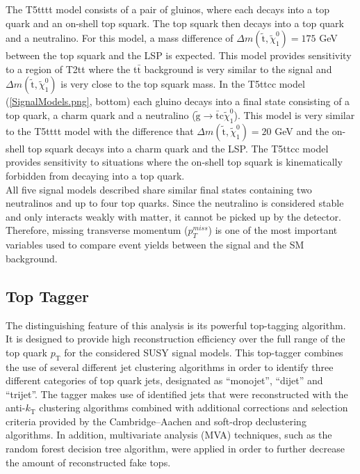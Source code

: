 The T5tttt model consists of a pair of gluinos, where each decays into a top quark and an on-shell top squark. The top squark then decays into a top quark and a neutralino. For this model, a mass difference of $\Delta m(\tilde{\text{t}},\tilde{\chi}_{1}^{0}) = 175$ GeV between the top squark and the LSP is expected. This model provides sensitivity to a region of T2tt where the t$\bar{\text{t}}$ background is very similar to the signal and $\Delta m(\tilde{\text{t}},\tilde{\chi}_{1}^{0})$ is very close to the top squark mass. In the T5ttcc model (\autoref{SignalModels.png}, bottom) each gluino decays into a final state consisting of a top quark, a charm quark and a neutralino ($\tilde{\text{g}}\rightarrow\bar{\text{t}}\text{c}\tilde{\chi}_{1}^{0}$). This model is very similar to the T5tttt model with the difference that $\Delta m(\tilde{\text{t}},\tilde{\chi}_{1}^{0}) = 20$ GeV and the on-shell top squark decays into a charm quark and the LSP. The T5ttcc model provides sensitivity to situations where the on-shell top squark is kinematically forbidden from decaying into a top quark.\\

All five signal models described share similar final states containing two neutralinos and up to four top quarks. Since the neutralino is considered stable and only interacts weakly with matter, it cannot be picked up by the detector. Therefore, missing transverse momentum ($p_{T}^{miss}$) is one of the most important variables used to compare event yields between the signal and the SM background.

\subsection{Top Tagger}

The distinguishing feature of this analysis is its powerful top-tagging algorithm. It is designed to provide high reconstruction efficiency over the full range of the top quark $p_\text{T}$ for the considered SUSY signal models. This top-tagger combines the use of several different jet clustering algorithms in order to identify three different categories of top quark jets, designated as ``monojet'', ``dijet'' and ``trijet''. The tagger makes use of identified jets that were reconstructed with the anti-$k_\text{T}$\cite{AntiKt} clustering algorithms combined with additional corrections and selection criteria provided by the Cambridge--Aachen\cite{JetAlg1} and soft-drop declustering\cite{SoftDrop} algorithms. In addition, multivariate analysis (MVA) techniques, such as the random forest decision tree algorithm\cite{RandForest1}, were applied in order to further decrease the amount of reconstructed fake tops.\\

